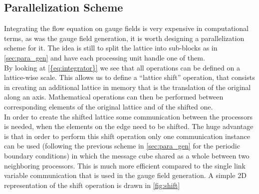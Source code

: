\subsection{Parallelization Scheme}
\label{sec:shift}
Integrating the flow equation on gauge fields is very expensive in computational terms, as was the gauge field generation,  it is worth designing a parallelization scheme for it. The idea is still to split the lattice into sub-blocks as in \cref{sec:para_gen} and have each processing unit handle one of them.\\
By looking at \cref{{eq:integrator}} we see that all operations can be defined on a lattice-wise scale. This allows us to define a ``lattice shift'' operation, that consists in creating an additional lattice in memory that is the translation of the original along an axis. Mathematical operations can then be performed between corresponding elements of the original lattice and of the shifted one. \\
In order to create the shifted lattice some communication between the processors is needed, when the elements on the edge need to be shifted. The huge advantage is that in order to perform this shift operation only one communication instance can be used (following the previous scheme in \cref{sec:para_gen} for the periodic boundary conditions) in which the message cube shared as a whole between two neighboring processors. This is much more efficient compared to the single link variable communication that is used in the gauge field generation. A simple 2D representation of the shift operation is drawn in \cref{fig:shift}


